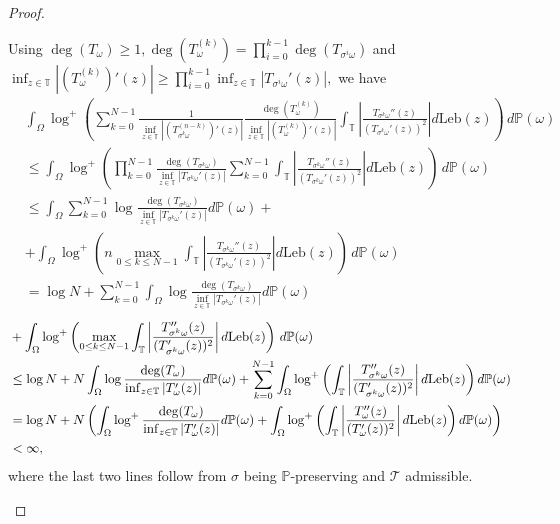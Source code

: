 \documentclass[12pt,reqno]{amsart}
\numberwithin{theorem}{section}
\begin{document}
\begin{proof}
\begin{description}
        Using $\deg(T_{\omega})\ge1, \deg(T_{\omega}^{(k)})=\prod_{i=0}^{k-1}\deg(T_{\sigma^{i}\omega})$ and $\inf_{z\in\mathbb{T}}|(T_{\omega}^{(k)})'(z)|\ge\prod_{i=0}^{k-1}\inf_{z\in\mathbb{T}}|T_{\sigma^{i}\omega}'(z)|,$ we have \begin{align*}
        &\int_{\Omega}\log^{+}\left(\sum_{k=0}^{N-1}\frac{1}{\inf_{z\in\mathbb{T}}|(T_{\sigma^{k}\omega}^{(n-k)})'(z)|}\frac{\deg(T_{\omega}^{(k)})}{\inf_{z\in\mathbb{T}}|(T_{\omega}^{(k)})'(z)|}\int_{\mathbb{T}}\left|\frac{T_{\sigma^{k}\omega}''(z)}{(T_{\sigma^{k}\omega}'(z))^2}\right|d\text{Leb}(z)\right)\,d\mathbb{P}(\omega)
        \\&\le\int_{\Omega}\log^{+}\left(\prod_{k=0}^{N-1}\frac{\deg(T_{\sigma^{k}\omega})}{\inf_{z\in\mathbb{T}}|T_{\sigma^{k}\omega}'(z)|}\sum_{k=0}^{N-1}\int_{\mathbb{T}}\left|\frac{T_{\sigma^{k}\omega}''(z)}{(T_{\sigma^{k}\omega}'(z))^2}\right|d\text{Leb}(z)\right)\,d\mathbb{P}(\omega)
        \\&\le\int_{\Omega}\sum_{k=0}^{N-1}\log\frac{\deg(T_{\sigma^{k}\omega})}{\inf_{z\in\mathbb{T}}|T_{\sigma^{k}\omega}'(z)|}d\mathbb{P}(\omega)+
        \\&+\int_{\Omega}\log^{+}\left(n\max_{0\le k\le N-1}\int_{\mathbb{T}}\left|\frac{T_{\sigma^{k}\omega}''(z)}{(T_{\sigma^{k}\omega}'(z))^2}\right|d\text{Leb}(z)\right)\,d\mathbb{P}(\omega)
        \\&=\log N+\sum_{k=0}^{N-1}\int_{\Omega}\log\frac{\deg(T_{\sigma^{k}\omega})}{\inf_{z\in\mathbb{T}}|T_{\sigma^{k}\omega}'(z)|}d\mathbb{P}(\omega)
        \end{align*}\begin{align*}&\hspace{\fill}+\int_{\Omega}\log^{+}\left(\max_{0\le k\le N-1}\int_{\mathbb{T}}\left|\frac{T_{\sigma^{k}\omega}''(z)}{(T_{\sigma^{k}\omega}'(z))^2}\right|d\text{Leb}(z)\right)\,d\mathbb{P}(\omega)
        \\&\le\log N+N\int_{\Omega}\log\frac{\deg(T_{\omega})}{\inf_{z\in\mathbb{T}}|T_{\omega}'(z)|}d\mathbb{P}(\omega)+\sum_{k=0}^{N-1}\int_{\Omega}\log^{+}\left(\int_{\mathbb{T}}\left|\frac{T_{\sigma^{k}\omega}''(z)}{(T_{\sigma^{k}\omega}'(z))^2}\right|d\text{Leb}(z)\right)d\mathbb{P}(\omega)
        \\&=\log N +N\left(\int_{\Omega}\log^{+}\frac{\deg(T_{\omega})}{\inf_{z\in\mathbb{T}}|T_{\omega}'(z)|}d\mathbb{P}(\omega)+\int_{\Omega}\log^{+}\left(\int_{\mathbb{T}}\left|\frac{T_{\omega}''(z)}{(T_{\omega}'(z))^2}\right|d\text{Leb}(z)\right)d\mathbb{P}(\omega)\right)\\&<\infty,
    \end{align*} where the last two lines follow from $\sigma$ being $\mathbb{P}$-preserving and $\mathcal{T}$ admissible.


\end{description}
\end{proof}
\end{document}
